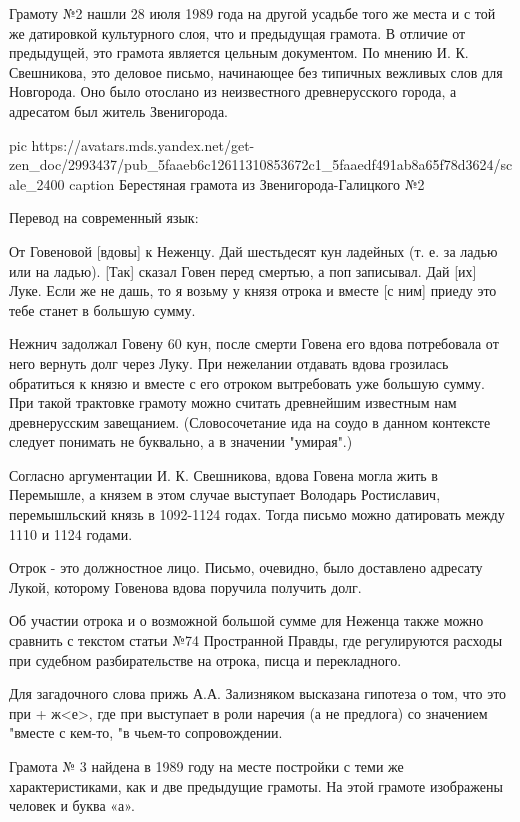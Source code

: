 Грамоту №2 нашли 28 июля 1989 года на другой усадьбе того же места и с той же
датировкой культурного слоя, что и предыдущая грамота. В отличие от предыдущей,
это грамота является цельным документом. По мнению И. К. Свешникова, это
деловое письмо, начинающее без типичных вежливых слов для Новгорода. Оно было
отослано из неизвестного древнерусского города, а адресатом был житель
Звенигорода.

\ifcmt
  pic https://avatars.mds.yandex.net/get-zen_doc/2993437/pub_5faaeb6c12611310853672c1_5faaedf491ab8a65f78d3624/scale_2400
  caption Берестяная грамота из Звенигорода-Галицкого №2
\fi

Перевод на современный язык:

От Говеновой [вдовы] к Неженцу. Дай шестьдесят кун ладейных (т. е. за ладью или
на ладью). [Так] сказал Говен перед смертью, а поп записывал. Дай [их] Луке.
Если же не дашь, то я возьму у князя отрока и вместе [с ним] приеду  это
тебе станет в большую сумму.

Нежнич задолжал Говену 60 кун, после смерти Говена его вдова потребовала от
него вернуть долг через Луку. При нежелании отдавать вдова грозилась обратиться
к князю и вместе с его отроком вытребовать уже большую сумму. При такой
трактовке грамоту можно считать древнейшим известным нам древнерусским
завещанием. (Словосочетание ида на соудо в данном контексте следует понимать не
буквально, а в значении "умирая".)

Согласно аргументации И. К. Свешникова, вдова Говена могла жить в Перемышле, а
князем в этом случае выступает Володарь Ростиславич, перемышльский князь в
1092-1124 годах. Тогда письмо можно датировать между 1110 и 1124 годами.

Отрок - это должностное лицо. Письмо, очевидно, было доставлено адресату
Лукой, которому Говенова вдова поручила получить долг.

Об участии отрока и о возможной большой сумме для Неженца также можно сравнить
с текстом статьи №74 Пространной Правды, где регулируются расходы при судебном
разбирательстве на отрока, писца и перекладного.

Для загадочного слова прижь А.А. Зализняком высказана гипотеза о том, что это
при + ж<е>, где при выступает в роли наречия (а не предлога) со значением
"вместе с кем-то, "в чьем-то сопровождении.

Грамота № 3 найдена в 1989 году на месте постройки с теми же характеристиками,
как и две предыдущие грамоты. На этой грамоте изображены человек и буква «а». 

